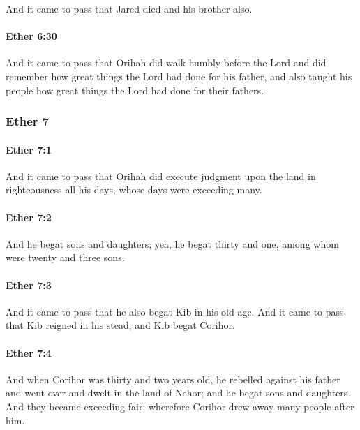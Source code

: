 			And it came to pass that Jared died and his brother also.

		\paragraph{Ether 6:30} %
			\label{ETHER-6-30}

			And it came to pass that Orihah did walk humbly before the Lord
			and did remember how great things the Lord had done for his father,
			and also taught his people how great things the Lord had done for their fathers.

	\subsubsection{Ether 7} %
		\label{ETHER-7}
		
		\paragraph{Ether 7:1} %
			\label{ETHER-7-1}

			And it came to pass that Orihah did execute judgment upon the land
			in righteousness all his days,
			whose days were exceeding many.

		\paragraph{Ether 7:2} %
			\label{ETHER-7-2}

			And he begat sons and daughters;
			yea, he begat thirty and one,
			among whom were twenty and three sons.

		\paragraph{Ether 7:3} %
			\label{ETHER-7-3}

			And it came to pass that he also begat Kib in his old age.
			And it came to pass that Kib reigned in his stead;
			and Kib begat Corihor.

		\paragraph{Ether 7:4} %
			\label{ETHER-7-4}

			And when Corihor was thirty and two years old,
			he rebelled against his father and went over and dwelt in the land of Nehor;
			and he begat sons and daughters.
			And they became exceeding fair;
			wherefore Corihor drew away many people after him.

